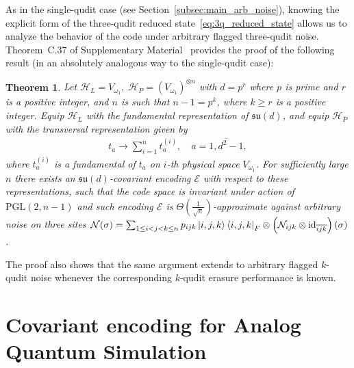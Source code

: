\documentclass[10pt,twocolumn,superscriptaddress,aps,amsmath,amssymb,citeautoscript,floatfix,prx,longbibliography]{revtex4-2}
\newtheorem{theorem}{Theorem}
\theoremstyle{plain}
\theoremstyle{plain}
\theoremstyle{plain}
\theoremstyle{plain}
\theoremstyle{plain}
\theoremstyle{plain}
\begin{document}
As in the single-qudit case (see Section~\ref{subsec:main_arb_noise}), knowing the explicit form of the three-qudit reduced state~\eqref{eq:3q_reduced_state} allows us to analyze the behavior of the code under arbitrary flagged three-qudit noise. Theorem~C.37 of Supplementary Material~\cite{SuppMat} provides the proof of the following result (in an absolutely analogous way to the single-qudit case):
\begin{theorem}
    Let
    $
        \mathcal H_L=V_{\omega_1},\;
        \mathcal H_P=(V_{\omega_1})^{\otimes n}
    $
    with $d=p^r$ where $p$ is prime and $r$ is a positive integer, 
    and $n$ is such that $n-1=p^k$, where $k \geq r$ is a positive integer. 
    Equip \(\mathcal H_L\) with the fundamental representation of
    \(\mathfrak{su}(d)\), and equip \(\mathcal H_P\) with the transversal
    representation given by
    \begin{equation}
    \begin{gathered}
    t_a \rightarrow \sum_{i=1}^n t_a^{(i)}, \quad a=\overline{1, d^2-1},
    \end{gathered}
    \end{equation} 
    where $t_a^{(i)}$ is a fundamental of $t_a$ on $i$-th physical space $V_{\omega_1}$. For sufficiently
    large $n$ there exists an $\mathfrak{su}(d)$-covariant encoding $\mathcal{E}$ with respect to these representations, such that the code space is invariant under action of $\mathrm{PGL}(2, n-1)$ and such encoding $\mathcal{E}$ is $\Theta\left(\frac{1}{\sqrt{n}}\right)$-approximate against arbitrary noise on three sites $\mathcal{N}(\sigma)=\sum_{1 \leq i<j<k \leq n} p_{i j k}\ket{i,j, k}\bra{i, j, k}_F \otimes\left(\mathcal{N}_{ijk} \otimes \mathrm{id}_{\overline{ijk}}\right)(\sigma)$.
\end{theorem}

The proof also shows that the same argument extends to arbitrary flagged \(k\)-qudit noise whenever the corresponding \(k\)-qudit erasure performance is known.

\section{Covariant encoding for Analog Quantum Simulation}\label{sec:main_covar_analog}
\end{document}
